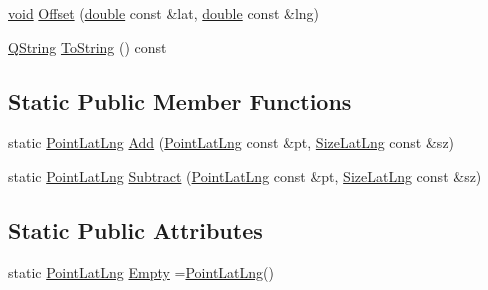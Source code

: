 \begin{DoxyCompactItemize}
\item 
\hyperlink{group___u_a_v_objects_plugin_ga444cf2ff3f0ecbe028adce838d373f5c}{void} \hyperlink{group___o_p_map_widget_ga41a2477cd6dbc4af991b30ddc2fc03c2}{Offset} (\hyperlink{_super_l_u_support_8h_a8956b2b9f49bf918deed98379d159ca7}{double} const \&lat, \hyperlink{_super_l_u_support_8h_a8956b2b9f49bf918deed98379d159ca7}{double} const \&lng)
\item 
\hyperlink{group___u_a_v_objects_plugin_gab9d252f49c333c94a72f97ce3105a32d}{Q\-String} \hyperlink{group___o_p_map_widget_gad6aaf34436258a8288cae1d93e13ad07}{To\-String} () const 
\end{DoxyCompactItemize}
\subsection*{Static Public Member Functions}
\begin{DoxyCompactItemize}
\item 
static \hyperlink{structinternals_1_1_point_lat_lng}{Point\-Lat\-Lng} \hyperlink{group___o_p_map_widget_ga52f0413f61d22a37409a17892acf80cd}{Add} (\hyperlink{structinternals_1_1_point_lat_lng}{Point\-Lat\-Lng} const \&pt, \hyperlink{structinternals_1_1_size_lat_lng}{Size\-Lat\-Lng} const \&sz)
\item 
static \hyperlink{structinternals_1_1_point_lat_lng}{Point\-Lat\-Lng} \hyperlink{group___o_p_map_widget_ga1666139610f408d4ec78b5afafdff3d9}{Subtract} (\hyperlink{structinternals_1_1_point_lat_lng}{Point\-Lat\-Lng} const \&pt, \hyperlink{structinternals_1_1_size_lat_lng}{Size\-Lat\-Lng} const \&sz)
\end{DoxyCompactItemize}
\subsection*{Static Public Attributes}
\begin{DoxyCompactItemize}
\item 
static \hyperlink{structinternals_1_1_point_lat_lng}{Point\-Lat\-Lng} \hyperlink{group___o_p_map_widget_gac62d167bf1e7f0374f7e536e64320c13}{Empty} =\hyperlink{structinternals_1_1_point_lat_lng}{Point\-Lat\-Lng}()
\end{DoxyCompactItemize}
